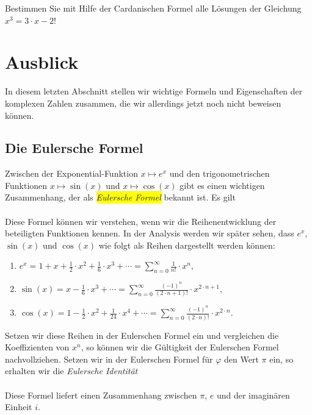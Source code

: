 \exercise
Bestimmen Sie mit Hilfe der Cardanischen Formel alle L\"{o}sungen der Gleichung 
\\[0.2cm]
\hspace*{1.3cm}
$x^3 = 3 \cdot x - 2$!
\exend


\section{Ausblick}
In diesem letzten Abschnitt stellen wir wichtige Formeln und Eigenschaften der komplexen Zahlen
zusammen, die wir allerdings jetzt noch nicht beweisen k\"{o}nnen.

\subsection{Die Eulersche Formel}
Zwischen der Exponential-Funktion $x \mapsto e^x$ und den trigonometrischen Funktionen 
$x \mapsto \sin(x)$ und $x \mapsto \cos(x)$ gibt es einen wichtigen Zusammenhang, der als
\colorbox{yellow}{\emph{Eulersche Formel}} bekannt ist.  Es gilt
\\[0.2cm]
\hspace*{1.3cm}
\colorbox{red}{}
\\[0.2cm]
Diese Formel k\"{o}nnen wir verstehen, wenn wir die Reihenentwicklung der beteiligten Funktionen kennen.
In der Analysis werden wir sp\"{a}ter sehen, dass $e^x$, $\sin(x)$ und $\cos(x)$ wie folgt als Reihen
dargestellt werden k\"{o}nnen:
\begin{enumerate}
\item $\displaystyle e^x = 1 + x + \frac{1}{2} \cdot x^2 + \frac{1}{6} \cdot x^3 + \cdots = \sum\limits_{n=0}^\infty \frac{1}{n!} \cdot x^n$,
\item $\displaystyle \sin(x) = x - \frac{1}{6} \cdot x^3 + \cdots = \sum\limits_{n=0}^\infty \frac{(-1)^{n}}{(2 \cdot n + 1)!} \cdot x^{2 \cdot n + 1}$,
\item $\displaystyle \cos(x) = 1 -  \frac{1}{2} \cdot x^2 +  \frac{1}{24} \cdot x^4 + \cdots = \sum\limits_{n=0}^\infty  \frac{(-1)^{n}}{(2 \cdot n)!} \cdot x^{2 \cdot n}$.
\end{enumerate}
Setzen wir diese Reihen in der Eulerschen Formel ein und vergleichen die Koeffizienten von $x^n$, so
k\"{o}nnen wir die G\"{u}ltigkeit der Eulerschen Formel nachvollziehen.  Setzen wir in der Eulerschen Formel
f\"{u}r $\varphi$ den Wert $\pi$ ein, so erhalten wir die \emph{Eulersche Identit\"{a}t}
\\[0.2cm]
\hspace*{1.3cm}
\colorbox{red}{}
\\[0.2cm]
Diese Formel liefert einen Zusammenhang zwischen $\pi$, $e$ und der imagin\"{a}ren Einheit $i$.
\pagebreak

